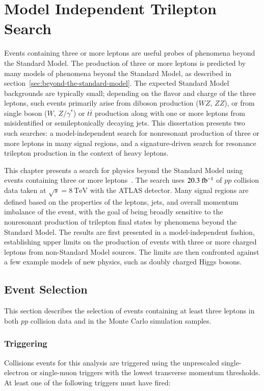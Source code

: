 \chapter{Model Independent Trilepton Search}\label{ch:model-independent-trilepton-search}

Events containing three or more leptons are useful probes of phenomena beyond the Standard Model. The production of three or more leptons is predicted by many models of phenomena beyond the Standard Model, as described in section~\ref{sec:beyond-the-standard-model}. The expected Standard Model backgrounds are typically small; depending on the flavor and charge of the three leptons, such events primarily arise from diboson production ($WZ$, $ZZ$), or from single boson ($W$, $Z/\gamma^{*}$) or $t\bar{t}$ production along with one or more leptons from misidentified or semileptonically decaying jets.  This dissertation presents two such searches: a model-independent search for nonresonant production of three or more leptons in many signal regions, and a signature-driven search for resonance trilepton production in the context of heavy leptons. 

This chapter presents a search for physics beyond the Standard Model using events containing three or more leptons~\cite{Aad:2014hja}. The search uses $20.3~\mbox{fb$^{-1}$}$ of $pp$ collision data taken at $\sqrt{s}=8~\mbox{TeV}$ with the ATLAS detector. Many signal regions are defined based on the properties of the leptons, jets, and overall momentum imbalance of the event, with the goal of being broadly sensitive to the nonresonant production of trilepton final states by phenomena beyond the Standard Model. The results are first presented in a model-independent fashion, establishing upper limits on the production of events with three or more charged leptons from non-Standard Model sources. The limits are then confronted against a few example models of new physics, such as doubly charged Higgs bosons. 

\section{Event Selection}\label{sec:model-independent-event-selection}

This section describes the selection of events containing at least three leptons in both $pp$ collision data and in the Monte Carlo simulation samples. 

\subsection{Triggering}
Collisions events for this analysis are triggered using the unprescaled single-electron or single-muon triggers with the lowest transverse momentum thresholds. At least one of the following triggers must have fired:

